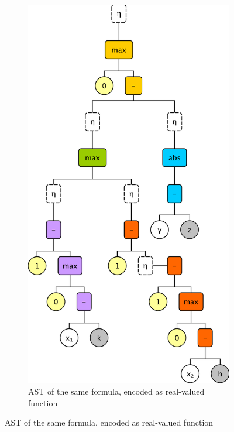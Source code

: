 \begin{figure}
\begin{subfigure}[]{0.3\linewidth}
        \includegraphics[scale=\astscale]{figures/ast-encoded}
        \caption{AST of the same formula, encoded as real-valued function}
        \label{fig:ast-encoded}
    \end{subfigure}
    \label{fig:ast}
\end{figure}
